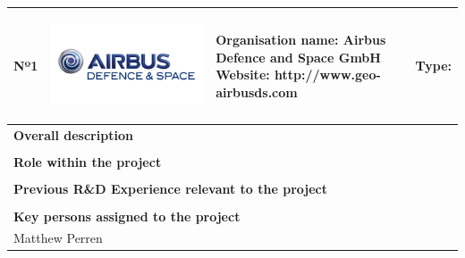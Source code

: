 \begin{longtable}[H]{|p{0.7cm}|p{4cm}|p{7cm}|p{1.3cm}|}
	\hline
	\begin{center} Nº1 \end{center} & \begin{center} \includegraphics[scale=0.09]{./logos/Airbus-defence-and-space-logo} \end{center} & \begin{center} \textbf{Organisation name:} Airbus Defence and Space GmbH \newline \textbf{Website:} http://www.geo-airbusds.com \end{center} & \begin{center} Type: \end{center} \\ \hline
	
	\multicolumn{4}{|p{13cm}|}{\textbf{Overall description}}  \\ \hline
	
	\multicolumn{4}{|p{13cm}|}{}  \\ \hline
	
	\multicolumn{4}{|p{13cm}|}{\textbf{Role within the project}}   \\ \hline
	
	\multicolumn{4}{|p{13cm}|}{}  \\ \hline
	
	\multicolumn{4}{|p{13cm}|}{\textbf{Previous R\&D Experience relevant to the project}}  \\ \hline
	
	\multicolumn{4}{|p{13cm}|}{}  \\ \hline
	
	\multicolumn{4}{|p{13cm}|}{\textbf{Key persons assigned to the project}}   \\ \hline
	
	
	\multicolumn{4}{|p{13cm}|}{Matthew Perren}  \\ \hline
	

\end{longtable}
